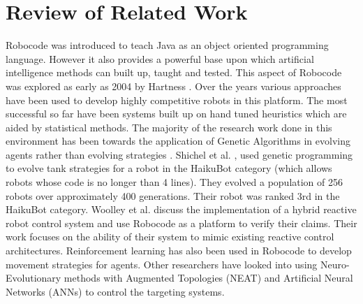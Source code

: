 \documentclass{article}
\theoremstyle{plain}
\theoremstyle{definition}
\theoremstyle{remark}
\begin{document}
 
\section{Review of Related Work}

Robocode was introduced to teach Java as an object oriented programming language. However it also provides a powerful base upon which artificial intelligence methods can built up, taught and tested. This aspect of Robocode was explored as early as 2004 by Hartness \cite{Hartness}. Over the years various approaches have been used to develop highly competitive robots in this platform. The most successful so far have been systems built up on hand tuned heuristics which are aided by statistical methods. The majority of the research work done in this environment has been towards the application of Genetic Algorithms in evolving agents rather than evolving strategies \cite{strategies, gp1, gp2}.  Shichel et al. \cite{gp1}, used genetic programming to evolve tank strategies for a robot in the HaikuBot category (which allows robots whose code is no longer than 4 lines). They evolved a population of 256 robots over approximately 400 generations. Their robot was ranked 3rd in the HaikuBot category. Woolley et al. \cite{woolley} discuss the implementation of a hybrid reactive robot control system and use Robocode as a platform to verify their claims. Their work focuses on the ability of their system to mimic existing reactive control architectures. Reinforcement learning has also been used in Robocode to develop movement strategies for agents\cite{gade}. Other researchers have looked into using Neuro-Evolutionary methods with Augmented Topologies (NEAT) and Artificial Neural Networks (ANNs) \cite{nielsenAI} to control the targeting systems.\\
\end{document}
